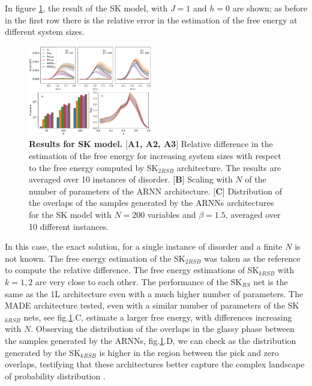 \documentclass[aps,physrev,10pt,floatfix,reprint]{revtex4-2}
\begin{document}
In figure \ref{fig:SK}, the result of the SK model, with $J=1$ and $h=0$ are shown; as before in the first row there is the relative error in the estimation of the free energy at different system sizes. 
\begin{figure}[h]
    \centering 
    \includegraphics[width=0.48\textwidth]{img/SK_res.pdf}
    \caption{\textbf{Results for SK model.} [\textbf{A1, A2, A3}] Relative difference in the estimation of the free energy for increasing system sizes with respect to the free energy computed by SK$_{2RSB}$ architecture. The results are averaged over 10 instances of disorder. [\textbf{B}] Scaling with $N$ of the number of parameters of the ARNN architecture. [\textbf{C}] Distribution of the overlaps of the samples generated by the ARNNs architectures for the SK model with $N=200$ variables and $\beta=1.5$, averaged over 10 different instances.}
    \label{fig:SK}
\end{figure}
In this case, the exact solution, for a single instance of disorder and a finite $N$ is not known. The free energy estimation of the SK$_{2RSB}$ was taken as the reference to compute the relative difference. The free energy estimations of SK$_{kRSB}$ with $k=1,2$ are very close to each other.
The performance of the SK$_{RS}$ net is the same as the 1L architecture even with a much higher number of parameters. The MADE architecture tested, even with a similar number of parameters of the SK$_{kRSB}$ nets, see fig.\ref{fig:SK}.C, estimate a larger free energy, with differences increasing with $N$. Observing the distribution of the overlaps in the glassy phase between the samples generated by the ARNNs, fig.\ref{fig:SK}.D, we can check as the distribution generated by the SK$_{kRSB}$ is higher in the region between the pick and zero overlaps, testifying that these architectures better capture the complex landscape of probability distribution \cite{PhysRevLett.51.1206}.
\end{document}

